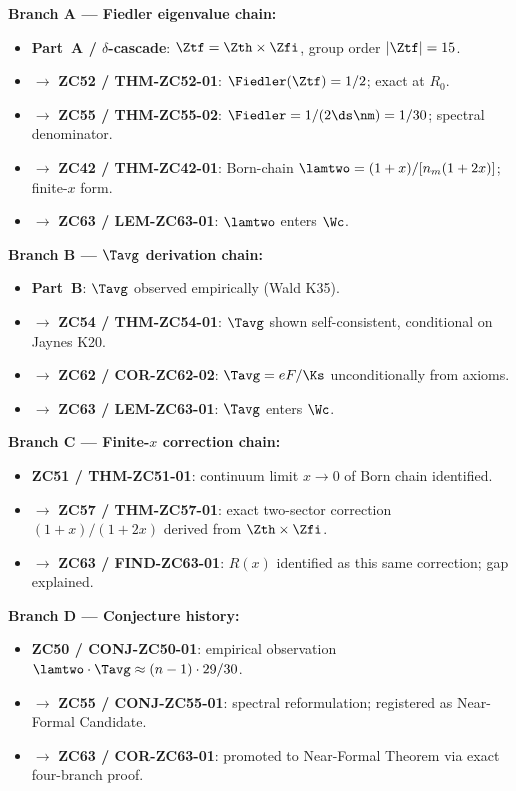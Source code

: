 \documentclass[12pt, a4paper]{article}
\begin{document}
\begin{genealogybox}[title={How ZC63's Key Objects Trace Back}]

\textbf{Branch A --- Fiedler eigenvalue chain:}
\begin{itemize}[leftmargin=2em, noitemsep]
  \item \textbf{Part~A / $\delta$-cascade}: $\Ztf = \Zth\times\Zfi$,
    group order $|\Ztf|=15$.
  \item $\to$ \textbf{ZC52 / THM-ZC52-01}: $\Fiedler(\Ztf) = 1/2$;
    exact at $R_0$.
  \item $\to$ \textbf{ZC55 / THM-ZC55-02}: $\Fiedler =
    1/(2\ds\nm) = 1/30$; spectral denominator.
  \item $\to$ \textbf{ZC42 / THM-ZC42-01}: Born-chain
    $\lamtwo = (1+x)/[n_m(1+2x)]$; finite-$x$ form.
  \item $\to$ \textbf{ZC63 / LEM-ZC63-01}: $\lamtwo$ enters $\Wc$.
\end{itemize}

\textbf{Branch B --- $\Tavg$ derivation chain:}
\begin{itemize}[leftmargin=2em, noitemsep]
  \item \textbf{Part~B}: $\Tavg$ observed empirically (Wald K35).
  \item $\to$ \textbf{ZC54 / THM-ZC54-01}: $\Tavg$ shown
    self-consistent, conditional on Jaynes K20.
  \item $\to$ \textbf{ZC62 / COR-ZC62-02}: $\Tavg = eF/\Ks$
    unconditionally from axioms.
  \item $\to$ \textbf{ZC63 / LEM-ZC63-01}: $\Tavg$ enters $\Wc$.
\end{itemize}

\textbf{Branch C --- Finite-$x$ correction chain:}
\begin{itemize}[leftmargin=2em, noitemsep]
  \item \textbf{ZC51 / THM-ZC51-01}: continuum limit
    $x\to0$ of Born chain identified.
  \item $\to$ \textbf{ZC57 / THM-ZC57-01}: exact two-sector
    correction $(1+x)/(1+2x)$ derived from $\Zth\times\Zfi$.
  \item $\to$ \textbf{ZC63 / FIND-ZC63-01}: $R(x)$ identified
    as this same correction; gap explained.
\end{itemize}

\textbf{Branch D --- Conjecture history:}
\begin{itemize}[leftmargin=2em, noitemsep]
  \item \textbf{ZC50 / CONJ-ZC50-01}: empirical observation
    $\lamtwo\cdot\Tavg \approx (n-1)\cdot29/30$.
  \item $\to$ \textbf{ZC55 / CONJ-ZC55-01}: spectral
    reformulation; registered as Near-Formal Candidate.
  \item $\to$ \textbf{ZC63 / COR-ZC63-01}: promoted to
    Near-Formal Theorem via exact four-branch proof.
\end{itemize}


\end{genealogybox}
\end{document}
